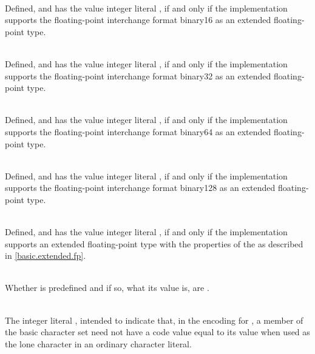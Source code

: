 \begin{description}
\item
{}%
\\
Defined, and has the value integer literal ,
if and only if the implementation supports
the \IsoFloatUndated{} floating-point interchange format binary16
as an extended floating-point type.

\item
{}%
\\
Defined, and has the value integer literal ,
if and only if the implementation supports
the \IsoFloatUndated{} floating-point interchange format binary32
as an extended floating-point type.

\item
{}%
\\
Defined, and has the value integer literal ,
if and only if the implementation supports
the \IsoFloatUndated{} floating-point interchange format binary64
as an extended floating-point type.

\item
{}%
\\
Defined, and has the value integer literal ,
if and only if the implementation supports
the \IsoFloatUndated{} floating-point interchange format binary128
as an extended floating-point type.

\item
{}%
\\
Defined, and has the value integer literal ,
if and only if the implementation supports an extended floating-point type
with the properties of the  
as described in \ref{basic.extended.fp}.

\item
{}%
\\
Whether  is predefined and if so, what its value is,
are .

\item
{}%
\\
The integer literal , intended to indicate that, in the encoding for
, a member of the basic character set need not have a code value equal to
its value when used as the lone character in an ordinary character literal.


\end{description}

